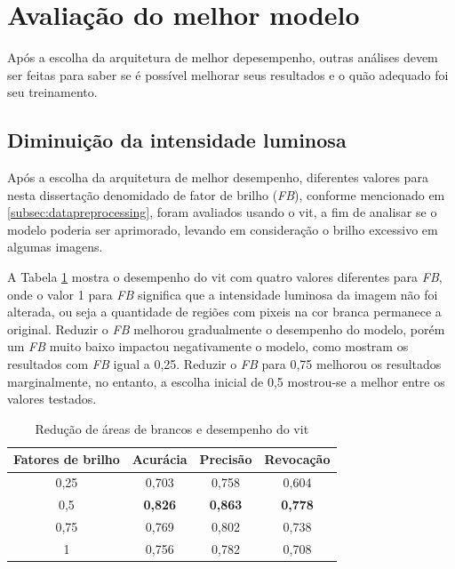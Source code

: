 \section{Avaliação do melhor modelo}\label{sec:bestmodel}

Após a escolha da arquitetura de melhor depesempenho, outras análises devem ser feitas para saber se é possível melhorar seus resultados e o quão adequado foi seu treinamento.

\subsection{Diminuição da intensidade luminosa}
Após a escolha da arquitetura de melhor desempenho, diferentes valores para nesta dissertação denomidado de fator de brilho (\textit{FB}), conforme mencionado em \ref{subsec:datapreprocessing}, foram avaliados usando o \acrshort{vit}, a fim de analisar se o modelo poderia ser aprimorado, levando em consideração o brilho excessivo em algumas imagens.

A Tabela \ref{tab:brightnessfactor} mostra o desempenho do \acrshort{vit} com quatro valores diferentes para \textit{FB}, onde o valor 1 para \textit{FB} significa que a intensidade luminosa da imagem não foi alterada, ou seja a quantidade de regiões com pixeis na cor branca permanece a original. 
Reduzir o \textit{FB} melhorou gradualmente o desempenho do modelo, porém um \textit{FB} muito baixo impactou negativamente o modelo, como mostram os resultados com \textit{FB} igual a 0,25. Reduzir o \textit{FB} para 0,75 melhorou os resultados marginalmente, no entanto, a escolha inicial de 0,5 mostrou-se a melhor entre os valores testados.

\begin{table}[tb]
\caption{\label{tab:brightnessfactor} Redução de áreas de brancos e desempenho do \acrshort{vit}}
\begin{center}
\begin{tabular}{c|ccc}
\toprule
 Fatores de brilho & Acurácia &  Precisão  & Revocação \\
\midrule
     0,25 & 0,703 & 0,758 & 0,604 \\
     0,5 & \textbf{0,826} & \textbf{0,863} & \textbf{0,778} \\
     0,75 & 0,769 & 0,802 & 0,738 \\
     1 & 0,756 & 0,782 & 0,708 \\
\bottomrule
\end{tabular}
\end{center}
\end{table}

